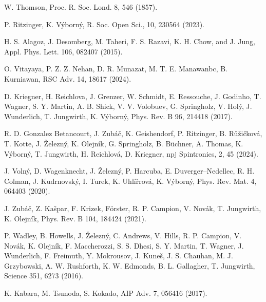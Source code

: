 \documentclass[prb,showpacs,amsmath,amssymb,superscriptaddress,twocolumn,floatfix]{revtex4-1}
\begin{document}
\begin{thebibliography}{99}



 W. Thomson, Proc. R. Soc. Lond. 8, 546 (1857). %

 P. Ritzinger, K. V\'yborn\'y, R. Soc. Open Sci., 10, 230564 (2023). %

 H. S. Alagoz, J. Desomberg, M. Taheri, F. S. Razavi, K. H. Chow, and J. Jung, Appl. Phys. Lett. 106, 082407 (2015).

 O. Vitayaya, P. Z. Z. Nehan, D. R. Munazat, M. T. E. Manawanbc,  B. Kurniawan, %
RSC Adv. 14, 18617 (2024). %


 D. Kriegner, H. Reichlova, J. Grenzer, W. Schmidt, E. Ressouche, J. Godinho, T. Wagner, S. Y. Martin, A. B. Shick, V. V. Volobuev, G. Springholz, V. Hol\'{y}, J. Wunderlich, T. Jungwirth, K. V\'{y}born\'{y}, Phys. Rev. B 96, 214418 (2017). %

 R. D. Gonzalez Betancourt, J. Zub\'a\v{c}, K. Geishendorf, P. Ritzinger, B. R\r{u}\v{z}i\v{c}kov\'a, T. Kotte, J. \v{Z}elezn\'y, K. Olejn\'ik, G. Springholz, B. B\"uchner, A. Thomas, K. V\'yborn\'y, T. Jungwirth, H. Reichlov\'a, D. Kriegner, npj Spintronics, 2, 45 (2024). %


 J. Voln\'y, D. Wagenknecht, J. \v{Z}elezn\'y, P. Harcuba, E. Duverger–Nedellec, R. H. Colman, J. Kudrnovsk\'y, I. Turek, K. Uhl\'i\v{r}rov\'a, K. V\'yborn\'y, Phys. Rev. Mat. 4, 064403 (2020).%

 J. Zub\'a\v{c}, Z. Ka\v{s}par, F. Krizek, F\"orster, R. P. Campion, V. Nov\'ak, T. Jungwirth, K. Olejn\'ik, Phys. Rev. B 104, 184424 (2021). %

 P. Wadley, B. Howells, J. \v{Z}elezn\'y, C. Andrews, V. Hills, R. P. Campion, V. Nov\'ak, K. Olejn\'ik, F. Maccherozzi, S. S. Dhesi, S. Y. Martin, T. Wagner, J. Wunderlich, F. Freimuth, Y. Mokrousov, J. Kune\v{s}, J. S. Chauhan, M. J. Grzybowski, A. W. Rushforth, K. W. Edmonds, B. L. Gallagher, T. Jungwirth, Science 351, 6273 (2016). %

 K. Kabara, M. Tsunoda, S. Kokado, AIP Adv. 7, 056416 (2017). %


\end{thebibliography}
\end{document}
